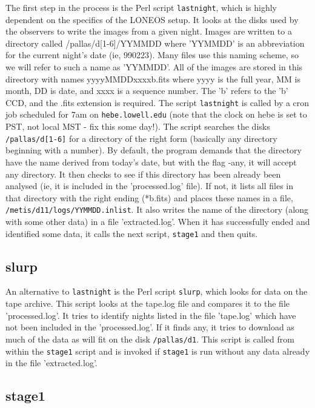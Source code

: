 \documentclass{article}
\begin{document}
The first step in the process is the Perl script {\tt lastnight},
which is highly dependent on the specifics of the LONEOS setup.  It
looks at the disks used by the observers to write the images from a
given night.  Images are written to a directory called
/pallas/d[1-6]/YYMMDD where 'YYMMDD' is an abbreviation for the current
night's date (ie, 990223).  Many files use this naming scheme, so we
will refer to such a name as 'YYMMDD'.  All of the images are stored
in this directory with names yyyyMMDDxxxxb.fits where yyyy is the full
year, MM is month, DD is date, and xxxx is a sequence number.  The 'b'
refers to the 'b' CCD, and the .fits extension is required.  The
script {\tt lastnight} is called by a cron job scheduled for 7am on
{\tt hebe.lowell.edu} (note that the clock on hebe is set to PST, not
local MST - fix this some day!).  The script searches the disks
{\tt /pallas/d[1-6]} for a directory of the right form (basically any
directory beginning with a number).  By default, the program demands
that the directory have the name derived from today's date, but with
the flag -any, it will accept any directory.  It then checks to see if
this directory has been already been analysed (ie, it is included in
the 'processed.log' file).  If not, it lists all files in that
directory with the right ending (*b.fits) and places these names in a
file, {\tt /metis/d11/logs/YYMMDD.inlist}.  It also writes the name of the
directory (along with some other data) in a file 'extracted.log'.
When it has successfully ended and identified some data, it calls the
next script, {\tt stage1} and then quits.

\subsection{slurp}

An alternative to {\tt lastnight} is the Perl script {\tt slurp},
which looks for data on the tape archive.  This script looks at the
tape.log file and compares it to the file 'processed.log'.  It tries
to identify nights listed in the file 'tape.log' which have not been
included in the 'processed.log'.  If it finds any, it tries to
download as much of the data as will fit on the disk {\tt /pallas/d1}.
This script is called from within the {\tt stage1} script and is
invoked if {\tt stage1} is run without any data already in
the file 'extracted.log'.

\subsection{stage1}
\end{document}
